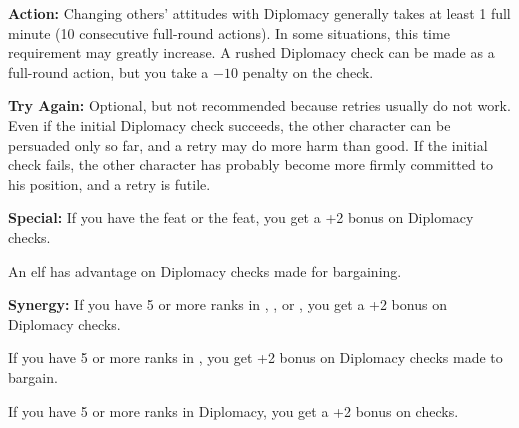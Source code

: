 \textbf{Action:} Changing others' attitudes with Diplomacy generally takes at least 1 full minute (10 consecutive full-round actions). In some situations, this time requirement may greatly increase. A rushed Diplomacy check can be made as a full-round action, but you take a $-10$ penalty on the check.

\textbf{Try Again:} Optional, but not recommended because retries usually do not work. Even if the initial Diplomacy check succeeds, the other character can be persuaded only so far, and a retry may do more harm than good. If the initial check fails, the other character has probably become more firmly committed to his position, and a retry is futile.

\textbf{Special:} If you have the  feat or the  feat, you get a +2 bonus on Diplomacy checks.

An elf has advantage on Diplomacy checks made for bargaining.

\textbf{Synergy:} If you have 5 or more ranks in , , or , you get a +2 bonus on Diplomacy checks.

If you have 5 or more ranks in , you get +2 bonus on Diplomacy checks made to bargain.

If you have 5 or more ranks in Diplomacy, you get a +2 bonus on  checks.
